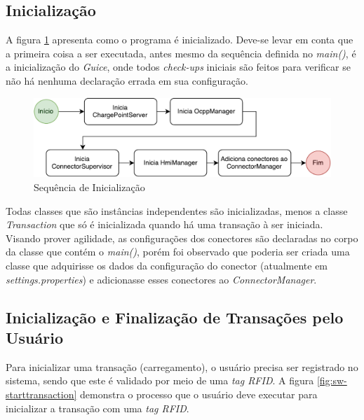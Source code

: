     \subsection{Inicialização}

      A figura \ref{fig:sw-init} apresenta como o programa é inicializado. Deve-se levar em conta que a primeira coisa a ser executada, antes mesmo da sequência definida no \textit{main()}, é a inicialização do \textit{Guice}, onde todos \textit{check-ups} iniciais são feitos para verificar se não há nenhuma declaração errada em sua configuração.

      \begin{figure}[H]
        \begin{center}
          \includegraphics[width=\textwidth]{assets/pdfs/sw-init.pdf}
          \caption{Sequência de Inicialização}
          \label{fig:sw-init}
        \end{center}
      \end{figure}

      Todas classes que são instâncias independentes são inicializadas, menos a classe \textit{Transaction} que só é inicializada quando há uma transação à ser iniciada. Visando prover agilidade, as configurações dos conectores são declaradas no corpo da classe que contém o \textit{main()}, porém foi observado que poderia ser criada uma classe que adquirisse os dados da configuração do conector (atualmente em \textit{settings.properties}) e adicionasse esses conectores ao \textit{ConnectorManager}.

    \subsection{Inicialização e Finalização de Transações pelo Usuário}

      Para inicializar uma transação (carregamento), o usuário precisa ser registrado no sistema, sendo que este é validado por meio de uma \textit{tag RFID}. A figura \ref{fig:sw-starttransaction} demonstra o processo que o usuário deve executar para inicializar a transação com uma \textit{tag RFID}.

